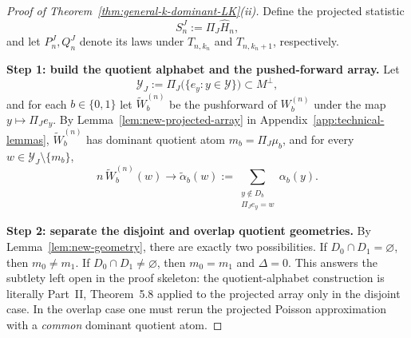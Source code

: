 \documentclass{article}
\newcommand{\1}{\mathbf 1}
\begin{document}
\begin{proof}[Proof of Theorem~\ref{thm:general-k-dominant-LK}(ii)]
Define the projected statistic
\[
S_n^J:=\Pi_J\widehat H_n,
\]
and let $P_n^J,Q_n^J$ denote its laws under $T_{n,k_n}$ and $T_{n,k_n+1}$, respectively.

\textbf{Step 1: build the quotient alphabet and the pushed-forward array.}
Let
\[
\mathcal Y_J:=\Pi_J\bigl(\{e_y:y\in\mathcal Y\}\bigr)\subset M^\perp,
\]
and for each $b\in\{0,1\}$ let $\widetilde W_b^{(n)}$ be the pushforward of $W_b^{(n)}$ under the map
$y\mapsto \Pi_J e_y$. By Lemma~\ref{lem:new-projected-array} in Appendix~\ref{app:technical-lemmas},
$\widetilde W_b^{(n)}$ has dominant quotient atom $m_b=\Pi_J\mu_b$, and for every
$w\in \mathcal Y_J\setminus\{m_b\}$,
\[
n\,\widetilde W_b^{(n)}(w)\to \widetilde \alpha_b(w):=
\sum_{\substack{y\notin D_b\\ \Pi_J e_y=w}}\alpha_b(y).
\]

\medskip
\textbf{Step 2: separate the disjoint and overlap quotient geometries.}
By Lemma~\ref{lem:new-geometry}, there are exactly two possibilities.
If $D_0\cap D_1=\varnothing$, then $m_0\neq m_1$. If $D_0\cap D_1\neq\varnothing$, then $m_0=m_1$ and
$\Delta=0$. This answers the subtlety left open in the proof skeleton: the quotient-alphabet construction is
literally Part~II, Theorem~5.8 applied to the projected array only in the disjoint case. In the overlap case one
must rerun the projected Poisson approximation with a \emph{common} dominant quotient atom.


\end{proof}
\end{document}
